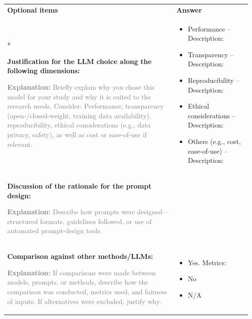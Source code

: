\documentclass[12pt]{article}
\newcommand{\unchecked}{\ding{111}} %
\begin{document}
\begin{longtable}{|p{}|p{}|}
\hline
\rowcolor{yellow!30}
\textbf{Optional items} & \textbf{Answer} \\*   %
\hline

\textbf{Justification for the LLM choice along the following dimensions:}

\textcolor{gray}{\footnotesize
\textbf{Explanation:} Briefly explain why you chose this model for your study and why it is suited to the research needs. Consider:
Performance, transparency (open-/closed-weight, training data availability), reproducibility, ethical considerations (e.g., data privacy, safety), as well as cost or ease-of-use if relevant.
}
&
\begin{itemize}[leftmargin=*]\setlength{\itemsep}{0pt}\setlength{\parskip}{0pt}
    \item[\unchecked] Performance – Description:
    \item[\unchecked] Transparency – Description:
    \item[\unchecked] Reproducibility – Description:
    \item[\unchecked] Ethical considerations – Description:
    \item[\unchecked] Others (e.g., cost, ease-of-use) – Description:
\end{itemize}
\\
\hline

\textbf{Discussion of the rationale for the prompt design:}

\textcolor{gray}{\footnotesize
\textbf{Explanation:} Describe how prompts were designed—structured formats, guidelines followed, or use of automated prompt-design tools.
}
&

\\
\hline

\textbf{Comparison against other methods/LLMs:}

\textcolor{gray}{\footnotesize
\textbf{Explanation:} If comparisons were made between models, prompts, or methods, describe how the comparison was conducted, metrics used, and fairness of inputs. If alternatives were excluded, justify why.
}
&
\begin{itemize}[leftmargin=*]\setlength{\itemsep}{0pt}
    \item[\unchecked] Yes. Metrics:
    \item[\unchecked] No
    \item[\unchecked] N/A
\end{itemize}
\\
\hline


\end{longtable}
\end{document}
